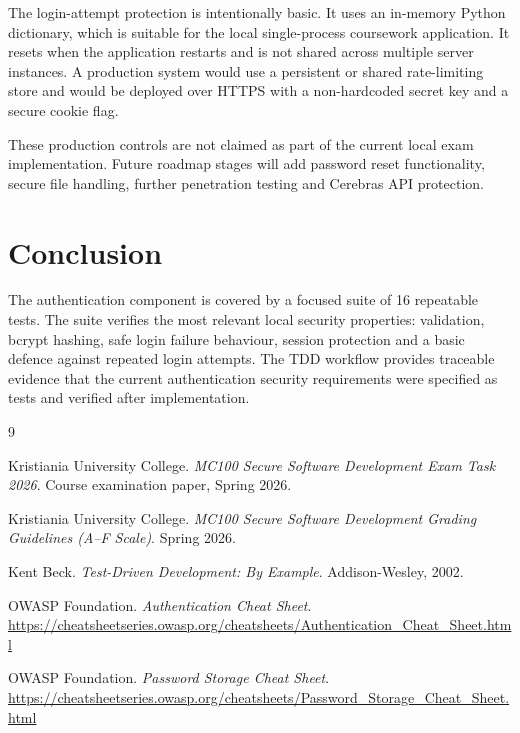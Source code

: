 \documentclass[11pt,a4paper]{article}
\begin{document}
The login-attempt protection is intentionally basic. It uses an in-memory Python
dictionary, which is suitable for the local single-process coursework
application. It resets when the application restarts and is not shared across
multiple server instances. A production system would use a persistent or shared
rate-limiting store and would be deployed over HTTPS with a non-hardcoded secret
key and a secure cookie flag.

These production controls are not claimed as part of the current local exam
implementation. Future roadmap stages will add password reset functionality,
secure file handling, further penetration testing and Cerebras API protection.

\section{Conclusion}

The authentication component is covered by a focused suite of 16 repeatable
tests. The suite verifies the most relevant local security properties: validation,
bcrypt hashing, safe login failure behaviour, session protection and a basic
defence against repeated login attempts. The TDD workflow provides traceable
evidence that the current authentication security requirements were specified as
tests and verified after implementation.

\begin{thebibliography}{9}

Kristiania University College.
\textit{MC100 Secure Software Development Exam Task 2026}.
Course examination paper, Spring 2026.

Kristiania University College.
\textit{MC100 Secure Software Development Grading Guidelines (A--F Scale)}.
Spring 2026.

Kent Beck.
\textit{Test-Driven Development: By Example}.
Addison-Wesley, 2002.

OWASP Foundation.
\textit{Authentication Cheat Sheet}.
\url{https://cheatsheetseries.owasp.org/cheatsheets/Authentication_Cheat_Sheet.html}

OWASP Foundation.
\textit{Password Storage Cheat Sheet}.
\url{https://cheatsheetseries.owasp.org/cheatsheets/Password_Storage_Cheat_Sheet.html}

\end{thebibliography}
\end{document}
